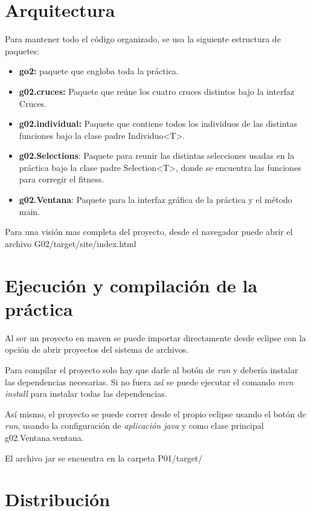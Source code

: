 \documentclass[twoside]{AiTeX}
\begin{document}
\section{Arquitectura}

Para mantener todo el código organizado, se usa la siguiente estructura de paquetes:

\begin{itemize}
    \item\textbf{go2:} paquete que engloba toda la práctica.
    \item\textbf{g02.cruces:} Paquete que reúne los cuatro cruces distintos bajo la interfaz Cruces.
    \item\textbf{g02.individual:} Paquete que contiene todos los individuos de las distintas funciones bajo la clase padre Individuo<T>.
    \item\textbf{g02.Selections}: Paquete para reunir las distintas selecciones usadas en la práctica bajo la clase padre Selection<T>, donde se encuentra las funciones para corregir el fitness.
    \item\textbf{g02.Ventana}: Paquete para la interfaz gráfica de la práctica y el método main.
\end{itemize}

Para una visión mas completa del proyecto, desde el navegador puede abrir el archivo G02/target/site/index.html

\section{Ejecución y compilación de la práctica}

Al ser un proyecto en maven se puede importar directamente desde eclipse con la opción de abrir proyectos del sistema de archivos.

Para compilar el proyecto solo hay que darle al botón de \textit{run} y debería instalar las dependencias necesarias. Si no fuera así se puede ejecutar el comando \textit{mvn install} para instalar todas las dependencias.

Así mismo, el proyecto se puede correr desde el propio eclipse usando el botón de \textit{run}, usando la configuración de \textit{aplicación java} y como clase principal g02.Ventana.ventana.

El archivo jar se encuentra en la carpeta P01/target/



\section{Distribución}
\end{document}
